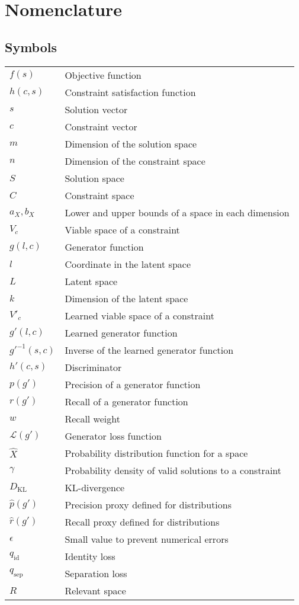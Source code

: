 \documentclass[../main.tex]{subfiles}
\begin{document}
\chapter*{Nomenclature}

\section*{Symbols}

\begin{longtable}[l]{ l l }
    $f(s)$ & Objective function \\ 
    $h(c, s)$ & Constraint satisfaction function \\  
    $s$ & Solution vector \\
    $c$ & Constraint vector \\
    $m$ & Dimension of the solution space \\
    $n$ & Dimension of the constraint space \\
    $S$ & Solution space \\
    $C$ & Constraint space \\
    $a_X, b_X$ & Lower and upper bounds of a space in each dimension \\
    $V_c$ & Viable space of a constraint \\
    $g(l, c)$ & Generator function \\
    $l$ & Coordinate in the latent space \\
    $L$ & Latent space \\
    $k$ & Dimension of the latent space \\
    $V'_c$ & Learned viable space of a constraint \\
    $g'(l, c)$ & Learned generator function \\
    $g'^{-1}(s, c)$ & Inverse of the learned generator function \\
    $h'(c,s)$ & Discriminator \\
    $p(g')$ & Precision of a generator function \\
    $r(g')$ & Recall of a generator function \\
    $w$ & Recall weight \\
    $\mathcal{L}(g')$ & Generator loss function \\
    $\hat{X}$ & Probability distribution function for a space \\
    $\gamma$ & Probability density of valid solutions to a constraint \\
    $D_\text{KL}$ & KL-divergence \\
    $\hat{p}(g')$ & Precision proxy defined for distributions \\
    $\hat{r}(g')$ & Recall proxy defined for distributions \\
    $\epsilon$ & Small value to prevent numerical errors \\
    $q_\text{id}$ & Identity loss \\
    $q_\text{sep}$ & Separation loss \\
    $R$ & Relevant space \\
\end{longtable}
\end{document}
